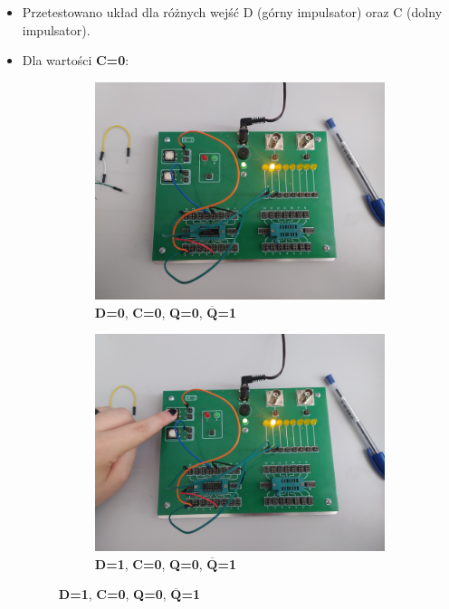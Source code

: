 \begin{itemize}
    \item Przetestowano układ dla różnych wejść D (górny impulsator) oraz C (dolny impulsator).
    \item Dla wartości \textbf{C=0}:
       \begin{figure}[H]
            \centering
            \begin{subfigure}[H]{0.48\textwidth}
                \includegraphics[width=\textwidth]{img/5_4/1653500525041_scaled.png}
                \caption*{\textbf{D=0}, \textbf{C=0}, \textbf{Q=0}, $\overline{\textbf{Q}}$\textbf{=1}}
            \end{subfigure}
            \begin{subfigure}[H]{0.48\textwidth}
                \includegraphics[width=\textwidth]{img/5_4/1653500525025_scaled.png}
                \caption*{\textbf{D=1}, \textbf{C=0}, \textbf{Q=0}, $\overline{\textbf{Q}}$\textbf{=1}}
            \end{subfigure}
        \end{figure}
        

\end{itemize}
